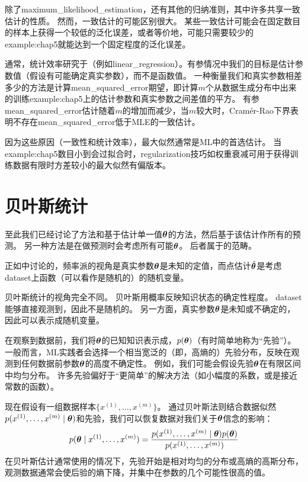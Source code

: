 除了\gls{maximum_likelihood_estimation}，还有其他的归纳准则，其中许多共享一致估计的性质。
然而，一致估计的可能区别很大。
某些一致估计可能会在固定数目的样本上获得一个较低的泛化误差，或者等价地，可能只需要较少的\gls{example:chap5}就能达到一个固定程度的泛化误差。

通常，统计效率研究于（例如\gls{linear_regression}）。有参情况中我们的目标是估计参数值（假设有可能确定真实参数），而不是函数值。
一种衡量我们和真实参数相差多少的方法是计算\gls{mean_squared_error}期望，即计算$m$个从数据生成分布中出来的训练\gls{example:chap5}上的估计参数和真实参数之间差值的平方。
有参\gls{mean_squared_error}估计随着$m$的增加而减少，当$m$较大时，Cram\'er-Rao下界\citep{Rao-1945,Cramer-1946}表明不存在\gls{mean_squared_error}低于\gls{MLE}的一致估计。

因为这些原因（一致性和统计效率），最大似然通常是\gls{ML}中的首选估计。
当\gls{example:chap5}数目小到会过拟合时，\gls{regularization}技巧如权重衰减可用于获得训练数据有限时方差较小的最大似然有偏版本。


\section{贝叶斯统计}
\label{sec:bayesian_statistics}
至此我们已经讨论了方法和基于估计单一值$\boldsymbol{\theta}$的方法，然后基于该估计作所有的预测。
另一种方法是在做预测时会考虑所有可能$\boldsymbol{\theta}$。
后者属于的范畴。

正如中讨论的，频率派的视角是真实参数$\boldsymbol{\theta}$是未知的定值，而点估计$\hat{\boldsymbol{\theta}}$是考虑\gls{dataset}上函数（可以看作是随机的）的随机变量。

贝叶斯统计的视角完全不同。
贝叶斯用概率反映知识状态的确定性程度。
\gls{dataset}能够直接观测到，因此不是随机的。
另一方面，真实参数$\boldsymbol{\theta}$是未知或不确定的，因此可以表示成随机变量。

在观察到数据前，我们将$\boldsymbol{\theta}$的已知知识表示成，$p(\boldsymbol{\theta})$（有时简单地称为“先验”）。
一般而言，\gls{ML}实践者会选择一个相当宽泛的（即，高熵的）先验分布，反映在观测到任何数据前参数$\boldsymbol{\theta}$的高度不确定性。
例如，我们可能会假设先验$\boldsymbol{\theta}$在有限区间中均匀分布。
许多先验偏好于“更简单”的解决方法（如小幅度的系数，或是接近常数的函数）。

现在假设有一组数据样本$\{x^{(1)},\dots,x^{(m)}\}$。
通过贝叶斯法则结合数据似然$p(x^{(1)},\dots,x^{(m)} \mid \boldsymbol{\theta})$和先验，我们可以恢复数据对我们关于$\boldsymbol{\theta}$信念的影响：
\begin{equation}
        p(\boldsymbol{\theta} \mid x^{(1)},\dots,x^{(m)}) = 
        \frac{p(x^{(1)},\dots,x^{(m)} \mid \boldsymbol{\theta}) p(\boldsymbol{\theta})}
            {p(x^{(1)},\dots,x^{(m)})}
\end{equation}
在贝叶斯估计通常使用的情况下，先验开始是相对均匀的分布或高熵的高斯分布，观测数据通常会使后验的熵下降，并集中在参数的几个可能性很高的值。

